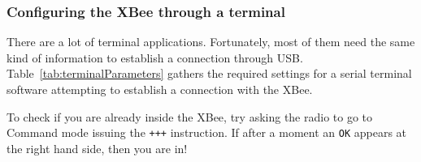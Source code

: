 \subsubsection{Configuring the XBee through a terminal }

There are a lot of terminal applications. Fortunately, most of them need the same kind of information to establish a connection through USB. Table~\ref{tab:terminalParameters} gathers the required settings for a serial terminal software attempting to establish a connection with the XBee.

\begin{table}[htbp]
	\centering
	\caption{Default terminal settings for establishing a connection with an XBee}
	\label{tab:terminalParameters}
\end{table}

To check if you are already inside the XBee, try asking the radio to go to Command mode issuing the \texttt{+++} instruction. If after a moment an \texttt{OK} appears at the right hand side, then you are in!


